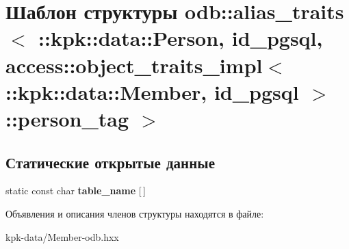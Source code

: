 \hypertarget{structodb_1_1alias__traits_3_01_01_01_01_01_01_01_01_01_01_01_01_01_01_01_01_01_01_1_1kpk_1_1dat5631ba71d2536753e4c12f2ffe2e52bf}{}\section{Шаблон структуры odb\+:\+:alias\+\_\+traits$<$ \+:\+:kpk\+:\+:data\+:\+:Person, id\+\_\+pgsql, access\+:\+:object\+\_\+traits\+\_\+impl$<$ \+:\+:kpk\+:\+:data\+:\+:Member, id\+\_\+pgsql $>$\+:\+:person\+\_\+tag $>$}
\label{structodb_1_1alias__traits_3_01_01_01_01_01_01_01_01_01_01_01_01_01_01_01_01_01_01_1_1kpk_1_1dat5631ba71d2536753e4c12f2ffe2e52bf}
\subsection*{Статические открытые данные}
\begin{DoxyCompactItemize}
\item 
static const char {\bfseries table\+\_\+name} \mbox{[}$\,$\mbox{]}\hypertarget{structodb_1_1alias__traits_3_01_01_01_01_01_01_01_01_01_01_01_01_01_01_01_01_01_01_1_1kpk_1_1dat5631ba71d2536753e4c12f2ffe2e52bf_a73b2009eb7a545425743c47666a567e9}{}\label{structodb_1_1alias__traits_3_01_01_01_01_01_01_01_01_01_01_01_01_01_01_01_01_01_01_1_1kpk_1_1dat5631ba71d2536753e4c12f2ffe2e52bf_a73b2009eb7a545425743c47666a567e9}

\end{DoxyCompactItemize}


Объявления и описания членов структуры находятся в файле\+:\begin{DoxyCompactItemize}
\item 
kpk-\/data/Member-\/odb.\+hxx\end{DoxyCompactItemize}
